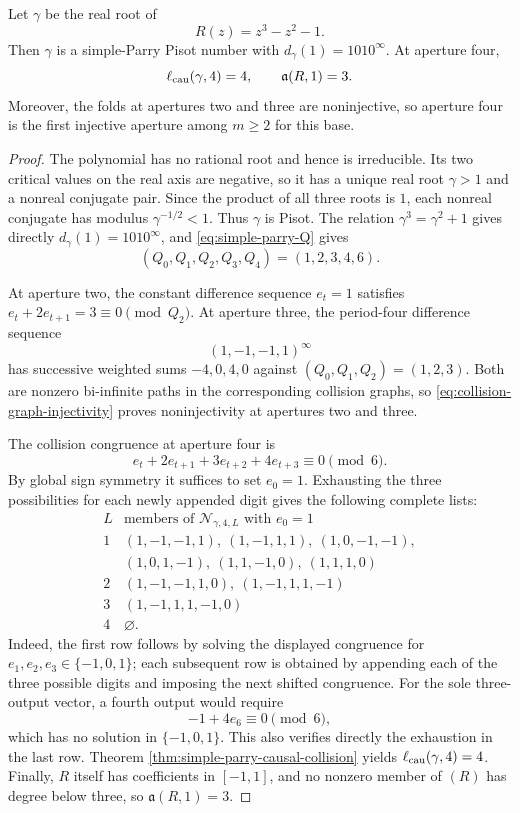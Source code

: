 \begin{proposition}
\label{prop:cubic-reverse-separation}
Let $\gamma$ be the real root of
\[
R(z)=z^3-z^2-1.
\]
Then $\gamma$ is a simple-Parry Pisot number with
$d_\gamma(1)=1010^\infty$.  At aperture four,
\[
\ell_{\rm cau}(\gamma,4)=4,
\qquad
\mathfrak a(R,1)=3.
\]
Moreover, the folds at apertures two and three are noninjective, so aperture
four is the first injective aperture among $m\ge2$ for this base.
\end{proposition}

\begin{proof}
The polynomial has no rational root and hence is irreducible.  Its two
critical values on the real axis are negative, so it has a unique real root
$\gamma>1$ and a nonreal conjugate pair.  Since the product of all three
roots is $1$, each nonreal conjugate has modulus $\gamma^{-1/2}<1$.  Thus
$\gamma$ is Pisot.  The relation $\gamma^3=\gamma^2+1$ gives directly
$d_\gamma(1)=1010^\infty$, and \eqref{eq:simple-parry-Q} gives
\[
(Q_0,Q_1,Q_2,Q_3,Q_4)=(1,2,3,4,6).
\]

At aperture two, the constant difference sequence $e_t=1$ satisfies
$e_t+2e_{t+1}=3\equiv0\pmod{Q_2}$.  At aperture three, the
period-four difference sequence
\[
(1,-1,-1,1)^\infty
\]
has successive weighted sums $-4,0,4,0$ against $(Q_0,Q_1,Q_2)=(1,2,3)$.
Both are nonzero bi-infinite paths in the corresponding collision graphs, so
\eqref{eq:collision-graph-injectivity} proves noninjectivity at apertures two
and three.

The collision congruence at aperture four is
\[
e_t+2e_{t+1}+3e_{t+2}+4e_{t+3}\equiv0\pmod6.
\]
By global sign symmetry it suffices to set $e_0=1$.  Exhausting the three
possibilities for each newly appended digit gives the following complete
lists:
\[
\begin{array}{c|l}
L&\text{members of }\mathcal N_{\gamma,4,L}\text{ with }e_0=1\\ \hline
1&(1,-1,-1,1),\ (1,-1,1,1),\ (1,0,-1,-1),\\
 & (1,0,1,-1),\ (1,1,-1,0),\ (1,1,1,0)\\
2&(1,-1,-1,1,0),\ (1,-1,1,1,-1)\\
3&(1,-1,1,1,-1,0)\\
4&\varnothing.
\end{array}
\]
Indeed, the first row follows by solving the displayed congruence for
$e_1,e_2,e_3\in\{-1,0,1\}$; each subsequent row is obtained by appending
each of the three possible digits and imposing the next shifted congruence.
For the sole three-output vector, a fourth output would require
\[
-1+4e_6\equiv0\pmod6,
\]
which has no solution in $\{-1,0,1\}$.  This also verifies directly the
exhaustion in the last row.  Theorem
\ref{thm:simple-parry-causal-collision} yields
$\ell_{\rm cau}(\gamma,4)=4$.  Finally, $R$ itself has coefficients in
$[-1,1]$, and no nonzero member of $(R)$ has degree below three, so
$\mathfrak a(R,1)=3$.
\end{proof}

